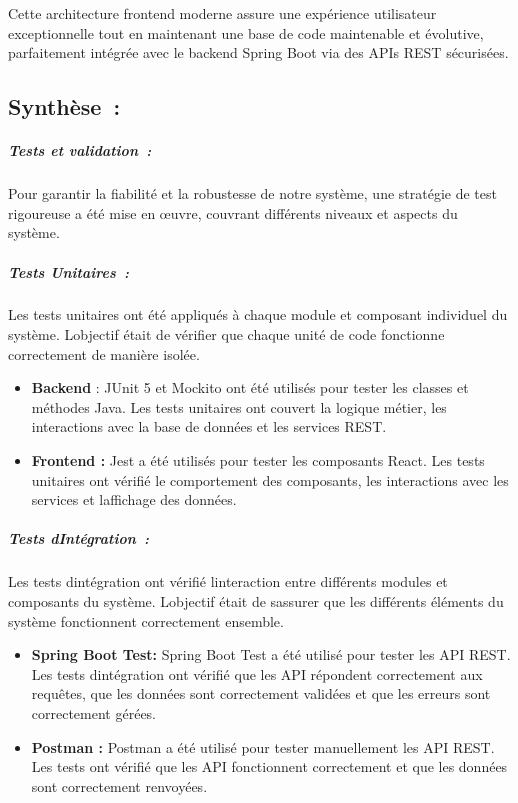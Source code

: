 \documentclass[12pt,a4paper,twoside]{report}
\begin{document}
Cette architecture frontend moderne assure une expérience utilisateur
exceptionnelle tout en maintenant une base de code maintenable et
évolutive, parfaitement intégrée avec le backend Spring Boot via des
APIs REST sécurisées.

\hypertarget{synthuxe8se-1}{%
\subsection{Synthèse~:}\label{synthuxe8se-1}}

\hypertarget{tests-et-validation}{%
\subparagraph{Tests et validation~:}\label{tests-et-validation}}

Pour garantir la fiabilité et la robustesse de notre système, une
stratégie de test rigoureuse a été mise en œuvre, couvrant différents
niveaux et aspects du système.

\hypertarget{tests-unitaires}{%
\subparagraph{Tests Unitaires~:}\label{tests-unitaires}}

Les tests unitaires ont été appliqués à chaque module et composant
individuel du système. L\textquotesingle objectif était de vérifier que
chaque unité de code fonctionne correctement de manière isolée.

\begin{itemize}
\item
  \textbf{Backend} : JUnit 5 et Mockito ont été utilisés pour tester les
  classes et méthodes Java. Les tests unitaires ont couvert la logique
  métier, les interactions avec la base de données et les services REST.
\item
  \textbf{Frontend :} Jest a été utilisés pour tester les composants
  React. Les tests unitaires ont vérifié le comportement des composants,
  les interactions avec les services et l\textquotesingle affichage des
  données.
\end{itemize}

\hypertarget{tests-dintuxe9gration}{%
\subparagraph{Tests
d\textquotesingle Intégration~:}\label{tests-dintuxe9gration}}

Les tests d\textquotesingle intégration ont vérifié
l\textquotesingle interaction entre différents modules et composants du
système. L\textquotesingle objectif était de s\textquotesingle assurer
que les différents éléments du système fonctionnent correctement
ensemble.

\begin{itemize}
\item
  \textbf{Spring Boot Test:} Spring Boot Test a été utilisé pour tester
  les API REST. Les tests d\textquotesingle intégration ont vérifié que
  les API répondent correctement aux requêtes, que les données sont
  correctement validées et que les erreurs sont correctement gérées.
\item
  \textbf{Postman :} Postman a été utilisé pour tester manuellement les
  API REST. Les tests ont vérifié que les API fonctionnent correctement
  et que les données sont correctement renvoyées.
\end{itemize}
\end{document}
